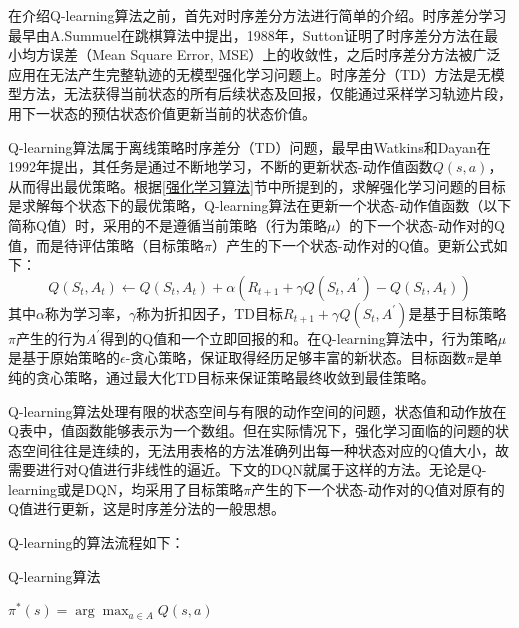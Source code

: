 在介绍Q-learning算法之前，首先对时序差分方法进行简单的介绍。时序差分学习最早由A.Summuel在跳棋算法中提出，1988年，Sutton证明了时序差分方法在最小均方误差（Mean Square Error, MSE）上的收敛性\cite{1998Reinforcement}，之后时序差分方法被广泛应用在无法产生完整轨迹的无模型强化学习问题上。时序差分（TD）方法是无模型方法，无法获得当前状态的所有后续状态及回报，仅能通过采样学习轨迹片段，用下一状态的预估状态价值更新当前的状态价值。

Q-learning算法属于离线策略时序差分（TD）问题，最早由Watkins和Dayan在1992年提出\cite{1992Technical}，其任务是通过不断地学习，不断的更新状态-动作值函数$Q(s,a)$，从而得出最优策略。根据\ref{强化学习算法}节中所提到的，求解强化学习问题的目标是求解每个状态下的最优策略，Q-learning算法在更新一个状态-动作值函数（以下简称Q值）时，采用的不是遵循当前策略（行为策略$\mu$）的下一个状态-动作对的Q值，而是待评估策略（目标策略$\pi$）产生的下一个状态-动作对的Q值。更新公式如下：
\begin{equation}\label{Q-learning}
    Q(S_t, A_t) \gets Q(S_t, A_t) + \alpha (R_{t+1}+\gamma Q(S_t, A^{'}) - Q(S_t, A_t))
\end{equation}
其中$\alpha$称为学习率，$\gamma$称为折扣因子，TD目标$R_{t+1}+\gamma Q(S_t, A^{'})$是基于目标策略$\pi$产生的行为$A^{'}$得到的Q值和一个立即回报的和。在Q-learning算法中，行为策略$\mu$是基于原始策略的$\epsilon$-贪心策略，保证取得经历足够丰富的新状态。目标函数$\pi$是单纯的贪心策略，通过最大化TD目标来保证策略最终收敛到最佳策略。

Q-learning算法处理有限的状态空间与有限的动作空间的问题，状态值和动作放在Q表中，值函数能够表示为一个数组。但在实际情况下，强化学习面临的问题的状态空间往往是连续的，无法用表格的方法准确列出每一种状态对应的Q值大小，故需要进行对Q值进行非线性的逼近。下文的DQN就属于这样的方法。无论是Q-learning或是DQN，均采用了目标策略$\pi$产生的下一个状态-动作对的Q值对原有的Q值进行更新，这是时序差分法的一般思想。

Q-learning的算法流程如下：

\begin{algorithm}[H]  
	\caption{Q-learning算法}%
    $\pi^{*}(s) = \arg \max_{a \in A} Q(s,a)$\;
\end{algorithm}

